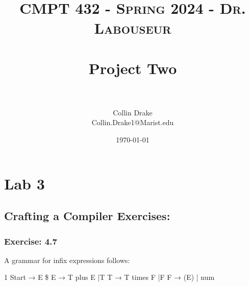 \documentclass[letterpaper, 10pt,DIV=13]{scrartcl}
\title{	
   \normalfont \normalsize 
   \textsc{CMPT 432 - Spring 2024 - Dr. Labouseur} \\[10pt] %
   \horrule{0.5pt} \\[0.25cm] 	%
   \huge Project Two  \\     	    %
   \horrule{0.5pt} \\[0.25cm] 	%
}
\author{Collin Drake \\ \normalsize Collin.Drake1@Marist.edu}
\date{\normalsize\today} 	%
\numberwithin{equation}{section} %
\numberwithin{figure}{section} %
\numberwithin{table}{section} %
\begin{document}
\maketitle %

\section*{Lab 3}

\subsection*{Crafting a Compiler Exercises:}

\subsubsection*{Exercise: 4.7}
A grammar for infix expressions follows:

    1 Start → E \$  E → T plus E    |T  T → T times F    |F  F → (E)    | num \newline
\end{document}
